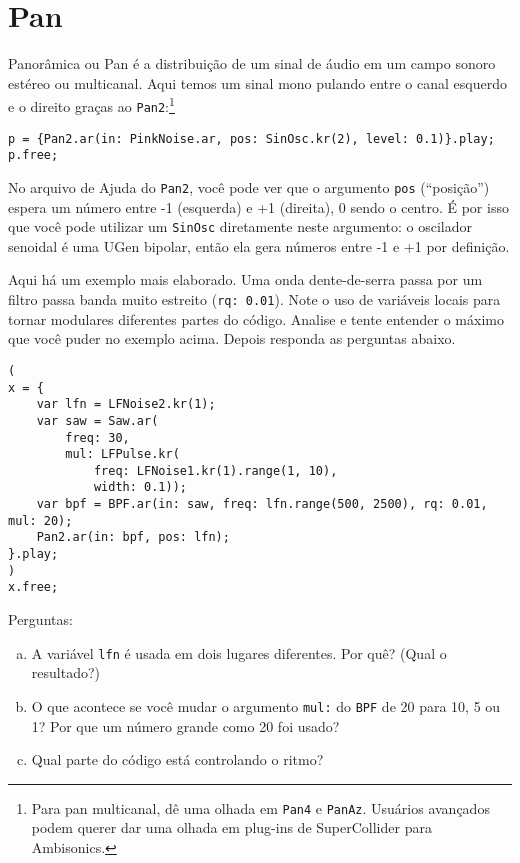 \section{Pan}

Panorâmica ou Pan é a distribuição de um sinal de áudio em um campo sonoro estéreo ou multicanal. Aqui temos um sinal mono pulando entre o canal esquerdo e o direito graças ao \texttt{Pan2}:\footnote{Para pan multicanal, dê uma olhada em \texttt{Pan4} e \texttt{PanAz}. Usuários avançados podem querer dar uma olhada em plug-ins de SuperCollider para Ambisonics.}
\begin{lstlisting}[style=SuperCollider-IDE, basicstyle=\scttfamily\footnotesize]
p = {Pan2.ar(in: PinkNoise.ar, pos: SinOsc.kr(2), level: 0.1)}.play;
p.free;
\end{lstlisting}
No arquivo de Ajuda do \texttt{Pan2}, você pode ver que o argumento \texttt{pos} (“posição”) espera um número entre -1 (esquerda) e +1 (direita), 0 sendo o centro. É por isso que você pode utilizar um \texttt{SinOsc} diretamente neste argumento: o oscilador senoidal é uma UGen bipolar, então ela gera números entre -1 e +1 por definição.

Aqui há um exemplo mais elaborado. Uma onda dente-de-serra passa por um filtro passa banda muito estreito (\texttt{rq: 0.01}). Note o uso de variáveis locais para tornar modulares diferentes partes do código. Analise e tente entender o máximo que você puder no exemplo acima. Depois responda as perguntas abaixo.

\begin{lstlisting}[style=SuperCollider-IDE, basicstyle=\scttfamily\footnotesize]
(
x = {
	var lfn = LFNoise2.kr(1);
	var saw = Saw.ar(
		freq: 30, 
		mul: LFPulse.kr(
			freq: LFNoise1.kr(1).range(1, 10),
			width: 0.1));
	var bpf = BPF.ar(in: saw, freq: lfn.range(500, 2500), rq: 0.01, mul: 20);
	Pan2.ar(in: bpf, pos: lfn);
}.play;
)
x.free;
\end{lstlisting}
 
Perguntas:
\begin{enumerate}[(a)]
\item A variável \texttt{lfn} é usada em dois lugares diferentes. Por quê? (Qual o resultado?)
\item O que acontece se você mudar o argumento \texttt{mul:} do \texttt{BPF} de 20 para 10, 5 ou 1? Por que um número grande como 20 foi usado?
\item Qual parte do código está controlando o ritmo?
\end{enumerate}

